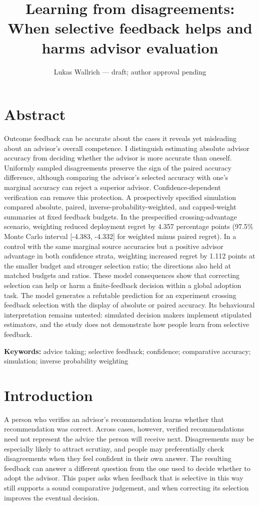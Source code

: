 \documentclass[
  british,
  11pt,
]{article}
\title{Learning from disagreements: When selective feedback helps and
harms advisor evaluation}
\author{Lukas Wallrich --- draft; author approval pending}
\date{}
\begin{document}
\maketitle

\section{Abstract}\label{abstract}

Outcome feedback can be accurate about the cases it reveals yet
misleading about an advisor's overall competence. I distinguish
estimating absolute advisor accuracy from deciding whether the advisor
is more accurate than oneself. Uniformly sampled disagreements preserve
the sign of the paired accuracy difference, although comparing the
advisor's selected accuracy with one's marginal accuracy can reject a
superior advisor. Confidence-dependent verification can remove this
protection. A prospectively specified simulation compared absolute,
paired, inverse-probability-weighted, and capped-weight summaries at
fixed feedback budgets. In the prespecified crossing-advantage scenario,
weighting reduced deployment regret by 4.357 percentage points (97.5\%
Monte Carlo interval {[}-4.383, -4.332{]} for weighted minus paired
regret). In a control with the same marginal source accuracies but a
positive advisor advantage in both confidence strata, weighting
increased regret by 1.112 points at the smaller budget and stronger
selection ratio; the directions also held at matched budgets and ratios.
These model consequences show that correcting selection can help or harm
a finite-feedback decision within a global adoption task. The model
generates a refutable prediction for an experiment crossing feedback
selection with the display of absolute or paired accuracy. Its
behavioural interpretation remains untested: simulated decision makers
implement stipulated estimators, and the study does not demonstrate how
people learn from selective feedback.

\textbf{Keywords:} advice taking; selective feedback; confidence;
comparative accuracy; simulation; inverse probability weighting

\section{Introduction}\label{introduction}

A person who verifies an advisor's recommendation learns whether that
recommendation was correct. Across cases, however, verified
recommendations need not represent the advice the person will receive
next. Disagreements may be especially likely to attract scrutiny, and
people may preferentially check disagreements when they feel confident
in their own answer. The resulting feedback can answer a different
question from the one used to decide whether to adopt the advisor. This
paper asks when feedback that is selective in this way still supports a
sound comparative judgement, and when correcting its selection improves
the eventual decision.
\end{document}
